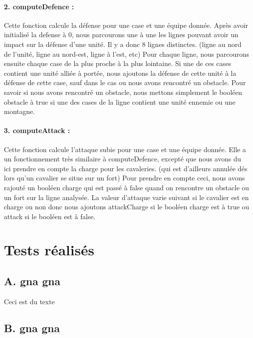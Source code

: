 \documentclass[12pt]{article}
\begin{document}
		\paragraph{2. computeDefence : }
		Cette fonction calcule la défense pour une case et une équipe donnée.
		Après avoir initialisé la defense à 0, nous parcourons une à une les lignes pouvant avoir un impact sur la défense d'une unité.
		Il y a donc 8 lignes distinctes. (ligne au nord de l'unité, ligne au nord-est, ligne à l'est, etc)
		Pour chaque ligne, nous parcourons ensuite chaque case de la plus proche à la plus lointaine.
		Si une de ces cases contient une unité alliée à portée, nous ajoutons la défense de cette unité à la défense de cette case, 
		sauf dans le cas ou nous avons rencontré un obstacle.
		Pour savoir si nous avons rencontré un obstacle, nous mettons simplement le booléen obstacle à true si une des cases de la 
		ligne contient une unité ennemie ou une montagne.
		
		\paragraph{3. computeAttack : }
		Cette fonction calcule l'attaque subie pour une case et une équipe donnée.
		Elle a un fonctionnement très similaire à computeDefence, excepté que nous avons du ici prendre en compte la charge pour les cavaleries. 
		(qui est d'ailleurs annulée dés lors qu'un cavalier se situe sur un fort)
		Pour prendre en compte ceci, nous avons rajouté un booléen charge qui est passé à false quand on rencontre un obstacle 
		ou un fort sur la ligne analysée.
		La valeur d'attaque varie suivant si le cavalier est en charge ou non donc nous ajoutons attackCharge si le booléen charge est 
		à true ou attack si le booléen est à false.
		
		\clearpage
		
	\section{Tests réalisés}    

		\subsection{ A. gna gna}
		
		Ceci est du texte
		
		\subsection{ B. gna gna}
		
\end{document}
